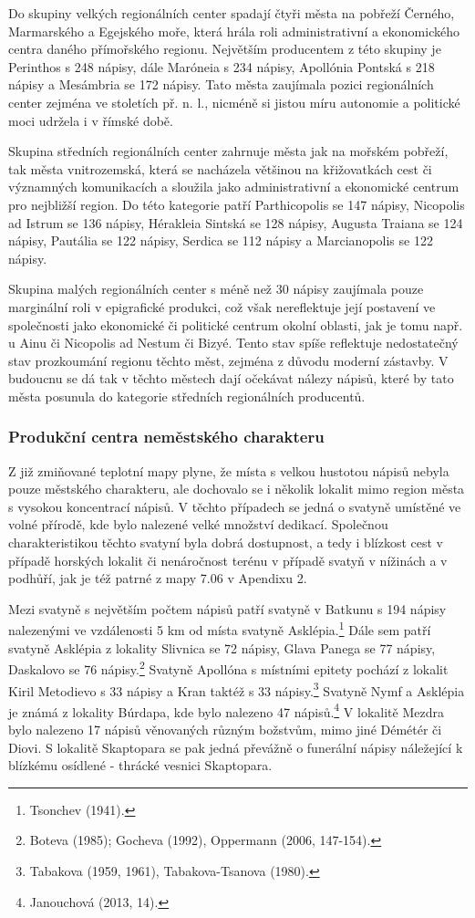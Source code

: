 Do skupiny velkých regionálních center spadají čtyři města na pobřeží Černého, Marmarského a Egejského moře, která hrála roli administrativní a ekonomického centra daného přímořského regionu. Největším producentem z této skupiny je Perinthos s 248 nápisy, dále Maróneia s 234 nápisy, Apollónia Pontská s 218 nápisy a Mesámbria se 172 nápisy. Tato města zaujímala pozici regionálních center zejména ve stoletích př. n. l., nicméně si jistou míru autonomie a politické moci udržela i v římské době.

Skupina středních regionálních center zahrnuje města jak na mořském pobřeží, tak města vnitrozemská, která se nacházela většinou na křižovatkách cest či významných komunikacích a sloužila jako administrativní a ekonomické centrum pro nejbližší region. Do této kategorie patří Parthicopolis se 147 nápisy, Nicopolis ad Istrum se 136 nápisy, Hérakleia Sintská se 128 nápisy, Augusta Traiana se 124 nápisy, Pautália se 122 nápisy, Serdica se 112 nápisy a Marcianopolis se 122 nápisy.

Skupina malých regionálních center s méně než 30 nápisy zaujímala pouze marginální roli v epigrafické produkci, což však nereflektuje její postavení ve společnosti jako ekonomické či politické centrum okolní oblasti, jak je tomu např. u Ainu či Nicopolis ad Nestum či Bizyé. Tento stav spíše reflektuje nedostatečný stav prozkoumání regionu těchto měst, zejména z důvodu moderní zástavby. V budoucnu se dá tak v těchto městech dají očekávat nálezy nápisů, které by tato města posunula do kategorie středních regionálních producentů.

\subsubsection[produkční-centra-neměstského-charakteru]{Produkční centra neměstského charakteru}

Z již zmiňované teplotní mapy plyne, že místa s velkou hustotou nápisů nebyla pouze městského charakteru, ale dochovalo se i několik lokalit mimo region města s vysokou koncentrací nápisů. V těchto případech se jedná o svatyně umístěné ve volné přírodě, kde bylo nalezené velké množství dedikací. Společnou charakteristikou těchto svatyní byla dobrá dostupnost, a tedy i blízkost cest v případě horských lokalit či nenáročnost terénu v případě svatyň v nížinách a v podhůří, jak je též patrné z mapy 7.06 v Apendixu 2.

Mezi svatyně s největším počtem nápisů patří svatyně v Batkunu s 194 nápisy nalezenými ve vzdálenosti 5 km od místa svatyně Asklépia.\footnote{Tsonchev (1941).} Dále sem patří svatyně Asklépia z lokality Slivnica se 72 nápisy, Glava Panega se 77 nápisy, Daskalovo se 76 nápisy.\footnote{Boteva (1985); Gocheva (1992), Oppermann (2006, 147-154).} Svatyně Apollóna s místními epitety pochází z lokalit Kiril Metodievo s 33 nápisy a Kran taktéž s 33 nápisy.\footnote{Tabakova (1959, 1961), Tabakova-Tsanova (1980).} Svatyně Nymf a Asklépia je známá z lokality Búrdapa, kde bylo nalezeno 47 nápisů.\footnote{Janouchová (2013, 14).} V lokalitě Mezdra bylo nalezeno 17 nápisů věnovaných různým božstvům, mimo jiné Démétér či Diovi. S lokalitě Skaptopara se pak jedná převážně o funerální nápisy náležející k blízkému osídlené - thrácké vesnici Skaptopara.

